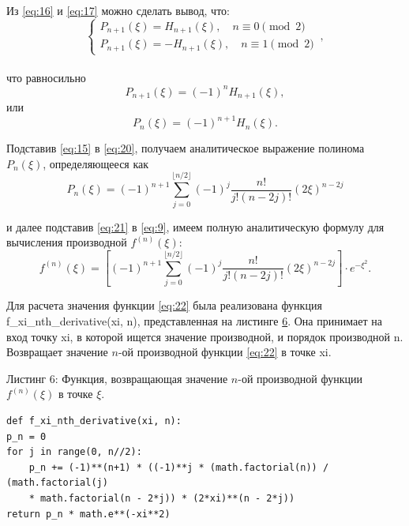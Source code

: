Из \eqref{eq:16} и \eqref{eq:17} можно сделать вывод, что:
\begin{equation}
\label{eq:18}
    \begin{cases}
      P_{n+1}(\xi) = H_{n+1}(\xi),\quad n \equiv 0 \pmod{2}         \\
      P_{n+1}(\xi) = -H_{n+1}(\xi),\quad n \equiv 1 \pmod{2}
    \end{cases}\,,
\end{equation}
\\
что равносильно
\begin{equation}
    P_{n+1}(\xi)=(-1)^nH_{n+1}(\xi),
\label{eq:19}
\end{equation}
или
\begin{equation}
    P_{n}(\xi)=(-1)^{n+1}H_{n}(\xi).
\label{eq:20}
\end{equation}

\vspace{5mm}
Подставив \eqref{eq:15} в \eqref{eq:20}, получаем аналитическое выражение полинома $P_{n}(\xi)$, определяющееся как
\begin{equation}
    P_{n}(\xi) = (-1)^{n+1}\sum_{j=0}^{\lfloor n/2 \rfloor} (-1)^j \frac{n!}{j! (n-2j)!} (2\xi)^{n-2j}
\label{eq:21}
\end{equation}

и далее подставив \eqref{eq:21} в \eqref{eq:9}, имеем полную аналитическую формулу для вычисления производной $f^{(n)}(\xi)$:
\begin{equation}
    f^{(n)}(\xi) = [(-1)^{n+1}\sum_{j=0}^{\lfloor n/2 \rfloor} (-1)^j \frac{n!}{j! (n-2j)!} (2\xi)^{n-2j}]\cdot e^{-\xi^2}.
\label{eq:22}
\end{equation}

Для расчета значения функции \eqref{eq:22} была реализована функция f\_xi\_nth\_derivative(xi, n), представленная на листинге \hyperref[lst:listing6]{6}. Она принимает на вход точку xi, в которой ищется значение производной, и порядок производной n. Возвращает значение $n$-ой производной функции \eqref{eq:22} в точке xi.
\pagebreak

Листинг 6: Функция, возвращающая значение $n$-ой производной функции $f^{(n)}(\xi)$ в точке $\xi$.
\begin{lstlisting}[label={lst:listing6}]
def f_xi_nth_derivative(xi, n):
p_n = 0
for j in range(0, n//2):
    p_n += (-1)**(n+1) * ((-1)**j * (math.factorial(n)) / (math.factorial(j)
    * math.factorial(n - 2*j)) * (2*xi)**(n - 2*j))
return p_n * math.e**(-xi**2)
\end{lstlisting}

